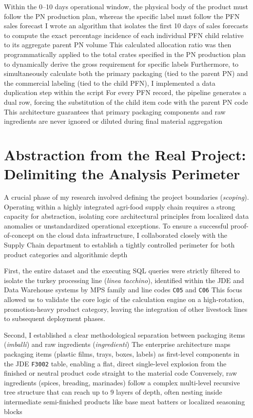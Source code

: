Within the 0–10 days operational window, the physical body of the product must follow the PN production plan, whereas the specific label must follow the PFN sales forecast %
I wrote an algorithm that isolates the first 10 days of sales forecasts to compute the exact percentage incidence of each individual PFN child relative to its aggregate parent PN volume %
This calculated allocation ratio was then programmatically applied to the total crates specified in the PN production plan to dynamically derive the gross requirement for specific labels %
Furthermore, to simultaneously calculate both the primary packaging (tied to the parent PN) and the commercial labeling (tied to the child PFN), I implemented a data duplication step within the script %
For every PFN record, the pipeline generates a dual row, forcing the substitution of the child item code with the parent PN code %
This architecture guarantees that primary packaging components and raw ingredients are never ignored or diluted during final material aggregation %

\section[Delimiting the Analysis Perimeter]{Abstraction from the Real Project: Delimiting the Analysis Perimeter}

A crucial phase of my research involved defining the project boundaries (\textit{scoping}). Operating within a highly integrated agri-food supply chain requires a strong capacity for abstraction, isolating core architectural principles from localized data anomalies or unstandardized operational exceptions. To ensure a successful proof-of-concept on the cloud data infrastructure, I collaborated closely with the Supply Chain department to establish a tightly controlled perimeter for both product categories and algorithmic depth %

First, the entire dataset and the executing SQL queries were strictly filtered to isolate the turkey processing line (\textit{linea tacchino}), identified within the JDE and Data Warehouse systems by MPS family and line codes \texttt{C05} and \texttt{C06} %
This focus allowed us to validate the core logic of the calculation engine on a high-rotation, promotion-heavy product category, leaving the integration of other livestock lines to subsequent deployment phases.

Second, I established a clear methodological separation between packaging items (\textit{imballi}) and raw ingredients (\textit{ingredienti}) %
The enterprise architecture maps packaging items (plastic films, trays, boxes, labels) as first-level components in the JDE \texttt{F3002} table, enabling a flat, direct single-level explosion from the finished or neutral product code straight to the material code %
Conversely, raw ingredients (spices, breading, marinades) follow a complex multi-level recursive tree structure that can reach up to 9 layers of depth, often nesting inside intermediate semi-finished products like base meat batters or localized seasoning blocks %

